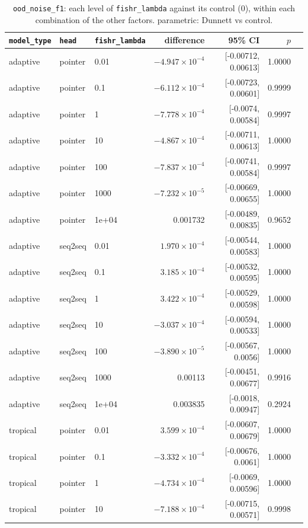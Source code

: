 \documentclass[10pt]{article}
\begin{document}
{\small
\begin{longtable}{lllrrrl}
\caption{\texttt{ood\_noise\_f1}: each level of \texttt{fishr\_lambda} against its control (0), within each combination of the other factors. parametric: Dunnett vs control.}\label{tab:control-ood_noise_f1}\\
\toprule
\texttt{model\_type} & \texttt{head} & \texttt{fishr\_lambda} & difference & 95\% CI & $p$ & \\
\midrule
\endhead
adaptive & pointer & 0.01 & $-4.947\times10^{-4}$ & [-0.00712, 0.00613] & 1.0000 & \\
adaptive & pointer & 0.1 & $-6.112\times10^{-4}$ & [-0.00723, 0.00601] & 0.9999 & \\
adaptive & pointer & 1 & $-7.778\times10^{-4}$ & [-0.0074, 0.00584] & 0.9997 & \\
adaptive & pointer & 10 & $-4.867\times10^{-4}$ & [-0.00711, 0.00613] & 1.0000 & \\
adaptive & pointer & 100 & $-7.837\times10^{-4}$ & [-0.00741, 0.00584] & 0.9997 & \\
adaptive & pointer & 1000 & $-7.232\times10^{-5}$ & [-0.00669, 0.00655] & 1.0000 & \\
adaptive & pointer & 1e+04 & 0.001732 & [-0.00489, 0.00835] & 0.9652 & \\
adaptive & seq2seq & 0.01 & $1.970\times10^{-4}$ & [-0.00544, 0.00583] & 1.0000 & \\
adaptive & seq2seq & 0.1 & $3.185\times10^{-4}$ & [-0.00532, 0.00595] & 1.0000 & \\
adaptive & seq2seq & 1 & $3.422\times10^{-4}$ & [-0.00529, 0.00598] & 1.0000 & \\
adaptive & seq2seq & 10 & $-3.037\times10^{-4}$ & [-0.00594, 0.00533] & 1.0000 & \\
adaptive & seq2seq & 100 & $-3.890\times10^{-5}$ & [-0.00567, 0.0056] & 1.0000 & \\
adaptive & seq2seq & 1000 & 0.00113 & [-0.00451, 0.00677] & 0.9916 & \\
adaptive & seq2seq & 1e+04 & 0.003835 & [-0.0018, 0.00947] & 0.2924 & \\
tropical & pointer & 0.01 & $3.599\times10^{-4}$ & [-0.00607, 0.00679] & 1.0000 & \\
tropical & pointer & 0.1 & $-3.332\times10^{-4}$ & [-0.00676, 0.0061] & 1.0000 & \\
tropical & pointer & 1 & $-4.734\times10^{-4}$ & [-0.0069, 0.00596] & 1.0000 & \\
tropical & pointer & 10 & $-7.188\times10^{-4}$ & [-0.00715, 0.00571] & 0.9998 & \\

\end{longtable}}
\end{document}
